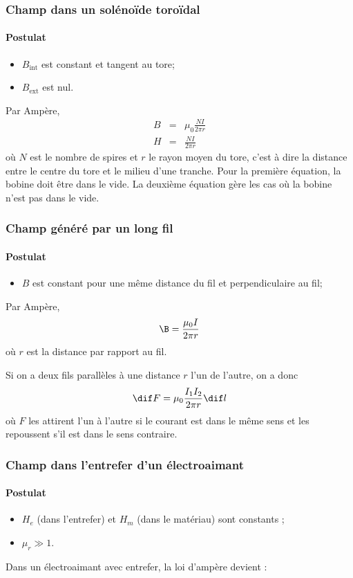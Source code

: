 \subsubsection{Champ dans un solénoïde toroïdal}
\label{sec:bst}
\paragraph{Postulat}
\begin{itemize}
  \item $B_\mathrm{int}$ est constant et tangent au tore;
  \item $B_\mathrm{ext}$ est nul.
\end{itemize}
Par Ampère,
\begin{eqnarray*}
  B &=& \mu_0\frac{NI}{2\pi r}\\
  H &=& \frac{NI}{2\pi r}
\end{eqnarray*}
où $N$ est le nombre de spires et $r$ le rayon moyen du tore,
c'est à dire la distance entre le centre du tore et le milieu d'une tranche.
Pour la première équation, la bobine doit être dans le vide.
La deuxième équation gère les cas où la bobine n'est pas dans le vide.

\subsubsection{Champ généré par un long fil}
\paragraph{Postulat}
\begin{itemize}
  \item $B$ est constant pour une même distance
    du fil et perpendiculaire au fil;
\end{itemize}
Par Ampère,
\[ \B = \frac{\mu_0I}{2\pi r} \]
où $r$ est la distance par rapport au fil.

Si on a deux fils parallèles à une distance $r$ l'un de l'autre, on a donc
\[ \dif F = \mu_0\frac{I_1I_2}{2\pi r}\dif l \]
où $F$ les attirent l'un à l'autre si le courant est
dans le même sens et les repoussent s'il est dans le sens contraire.

\subsubsection{Champ dans l'entrefer d'un électroaimant}
\paragraph{Postulat}
\begin{itemize}
  \item $H_e$ (dans l'entrefer) et $H_m$ (dans le matériau) sont constants ;
  \item $\mu_r \gg 1$.
\end{itemize}
Dans un électroaimant avec entrefer, la loi d'ampère devient :

